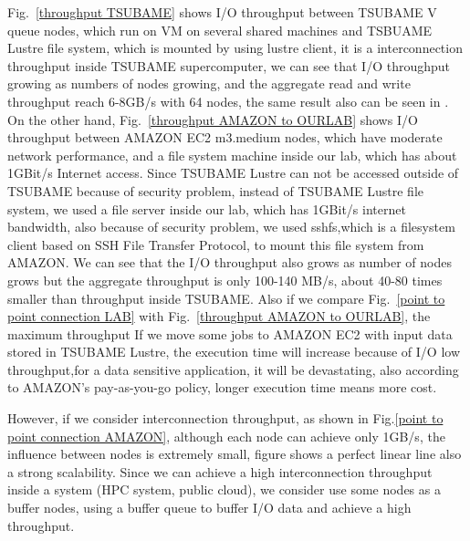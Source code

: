 \documentclass[JIP,draft]{ipsj}
\begin{document}
Fig.~\ref{throughput TSUBAME} shows I/O throughput between TSUBAME V queue nodes, which run on VM on several shared machines and TSBUAME Lustre file system, which is mounted by using lustre client, it is a interconnection throughput inside TSUBAME supercomputer, we can see that I/O throughput growing as numbers of nodes growing, and the aggregate read and write throughput reach 6-8GB/s with 64 nodes, the same result also can be seen in \cite{checkpointing}.
On the other hand, Fig.~\ref{throughput AMAZON to OURLAB} shows I/O throughput between AMAZON EC2 m3.medium nodes, which have moderate network performance, and a file system machine inside our lab, which has about 1GBit/s Internet access.
Since TSUBAME Lustre can not be accessed outside of TSUBAME because of security problem, instead of TSUBAME Lustre file system, we used a file server inside our lab, which has 1GBit/s internet bandwidth, also because of security problem, we used sshfs\cite{sshfs},which is a filesystem client based on SSH File Transfer Protocol, to mount this file system from AMAZON.
We can see that the I/O throughput also grows as number of nodes grows but the aggregate throughput is only 100-140 MB/s, about 40-80 times smaller than throughput inside TSUBAME.
Also if we compare Fig.~\ref{point to point connection LAB} with Fig.~\ref{throughput AMAZON to OURLAB}, the maximum throughput 
If we move some jobs to AMAZON EC2 with input data stored in TSUBAME Lustre, the execution time will increase because of I/O low throughput,for a data sensitive application, it will be devastating, also according to AMAZON's pay-as-you-go policy\cite{AMAZON_AWS}, longer execution time means more cost.

However, if we consider interconnection throughput, as shown in Fig.\ref{point to point connection AMAZON}, although each node can achieve only 1GB/s, the influence between nodes is extremely small, figure shows a perfect linear line also a strong scalability.
Since we can achieve a high interconnection throughput inside a system (HPC system, public cloud), we consider use some nodes as a buffer nodes, using a buffer queue to buffer I/O data and achieve a high throughput.
\end{document}
